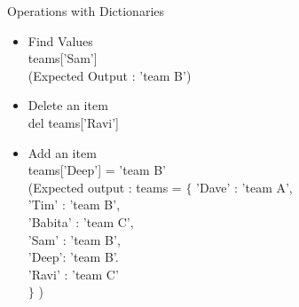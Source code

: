 \documentclass{beamer}
\theoremstyle{plain}
\theoremstyle{definition}
\begin{document}
\begin{frame}
Operations with Dictionaries
\begin{itemize}
			\item Find Values \\
			     teams['Sam'] \\
			     (Expected Output : 'team B')
			 \item Delete an item \\
			      del teams['Ravi'] \\
			  \item Add an item \\
			       teams['Deep'] = 'team B'\\
			       (Expected output :
			       teams = $\lbrace$ 'Dave' : 'team A',\\
             'Tim' : 'team B',\\
             'Babita' : 'team C',\\
             'Sam' : 'team B',\\
             'Deep': 'team B'. \\
             'Ravi' : 'team C' \\
            $\rbrace$
			       )
            \end{itemize}
			

\end{frame}
\end{document}

